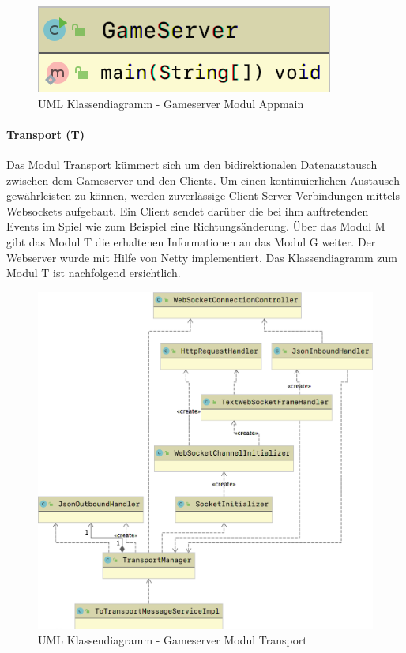 \documentclass[11pt,ngerman]{article}
\begin{document}
	\begin{figure}[H]
    	\centering
    	\includegraphics[scale=0.4]{figures/gameserver-uml/appmain-classes.png}
    	\caption{UML Klassendiagramm - Gameserver Modul Appmain}
    	\label{fig:UMLModulAppmain}
    \end{figure}	

    \paragraph{Transport (T)}
	Das Modul Transport kümmert sich um den bidirektionalen Datenaustausch zwischen dem Gameserver und den Clients. Um einen kontinuierlichen Austausch gewährleisten zu können, werden zuverlässige Client-Server-Verbindungen mittels \Gls{Websocket}s aufgebaut. Ein Client sendet darüber die bei ihm auftretenden Events im Spiel wie zum Beispiel eine Richtungsänderung. Über das Modul M gibt das Modul T die erhaltenen Informationen an das Modul G weiter. Der Webserver wurde mit Hilfe von \Gls{Netty} implementiert. Das Klassendiagramm zum Modul T ist nachfolgend ersichtlich. 
	
	\begin{figure}[H]
    	\centering
    	\includegraphics[scale=0.3]{figures/gameserver-uml/transport-classes.png}
    	\caption{UML Klassendiagramm - Gameserver Modul Transport}
    	\label{fig:UMLModulTransport}
    \end{figure}
\end{document}
